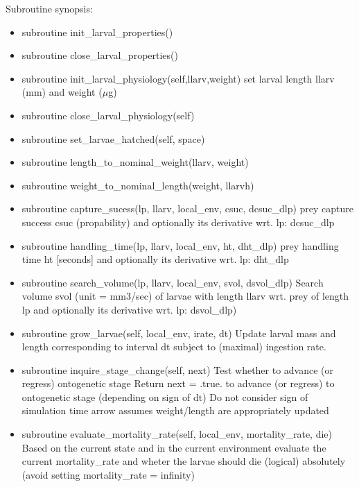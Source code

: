 Subroutine synopsis:
\begin{itemize}
  \item subroutine init\_larval\_properties() \newline
  \item subroutine close\_larval\_properties() \newline
  \item subroutine init\_larval\_physiology(self,llarv,weight) \newline
        set larval length llarv (mm) and weight ($\mu$g)
  \item subroutine close\_larval\_physiology(self) \newline
  \item subroutine set\_larvae\_hatched(self, space)  \newline
  \item subroutine length\_to\_nominal\_weight(llarv, weight) \newline
  \item subroutine weight\_to\_nominal\_length(weight, llarvh) \newline

  \item subroutine capture\_sucess(lp, llarv, local\_env, csuc, dcsuc\_dlp) \newline
        prey capture success csuc (propability) and optionally its derivative wrt. lp: dcsuc\_dlp

  \item subroutine handling\_time(lp, llarv, local\_env, ht, dht\_dlp) \newline
        prey handling time ht [seconds] and optionally its derivative wrt. lp: dht\_dlp
  \item subroutine search\_volume(lp, llarv, local\_env, svol, dsvol\_dlp) \newline
        Search volume svol (unit = mm3/sec) of larvae with length llarv
        wrt. prey of length lp and optionally its derivative wrt. lp: dsvol\_dlp)
  \item subroutine grow\_larvae(self, local\_env, irate, dt) \newline 
        Update larval mass and length corresponding to interval dt
        subject to (maximal) ingestion rate.    
  \item subroutine inquire\_stage\_change(self, next) \newline
        Test whether to advance (or regress) ontogenetic stage 
        Return next = .true. to advance (or regress) to ontogenetic stage (depending on sign of dt)
        Do not consider sign of simulation time arrow
        assumes weight/length are appropriately updated
  \item subroutine evaluate\_mortality\_rate(self, local\_env, mortality\_rate, die) \newline
        Based on the current state and in the current environment
        evaluate the current mortality\_rate and wheter the larvae 
        should die (logical) absolutely (avoid setting mortality\_rate = infinity) 
\end{itemize}     



